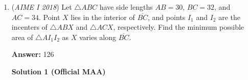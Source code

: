 \begin{enumerate}
 There are $\tbinom{6}{2}=12$ ways to choose the 2 elements in the set that are congruent to 2 mod 3 and $\tbinom{6}{2}+\tbinom{6}{5}$ possible ways to assign values to the numbers congruent to 1 mod 3. Therefore there are $15\cdot21=315$ configurations for this case.

 Case 4: There are three elements:

 There are $\tbinom{6}{3}=20$ ways to choose three elements in the set that are congruent to 2 mod 3. There are $\tbinom{6}{0}+\tbinom{6}{3}+\tbinom{6}{6}$ ways to assign values to the numbers congruent to 1 mod 3. Therefore, there are $20\cdot22=440$ configurations for this case.

 Case 5, Case 6, and Case 7 are symmetric to Case 3, Case 2, and Case 1 respectively so we can multiply by 2 for those cases. 

 Putting all the cases together we obtain $2(22+126+315) + 440=1366$. Multiplying by $2^6$ gives $2^6\cdot1366=2^7\cdot683$. Since $n=2^{18}$, $\frac{m}{n}=\frac{683}{2^{11}}$. Therefore, $m=\boxed{683}$

 (3b1b video on a very similar problem)

 


	\item (\textit{AIME I 2018}) Let $\triangle ABC$ have side lengths $AB=30$, $BC=32$, and $AC=34$. Point $X$ lies in the interior of $\overline{BC}$, and points $I_1$ and $I_2$ are the incenters of $\triangle ABX$ and $\triangle ACX$, respectively. Find the minimum possible area of $\triangle AI_1I_2$ as $X$ varies along $\overline{BC}$.


 
 \textbf{Answer: }126



\textbf{Solution 1 (Official MAA)}


\end{enumerate}
